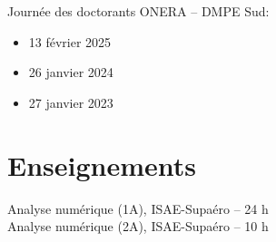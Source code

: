 \noindent
Journée des doctorants ONERA -- DMPE Sud:
\begin{itemize}
    \item[$\bullet$] 13 février 2025
    \item[$\bullet$] 26 janvier 2024
    \item[$\bullet$] 27 janvier 2023
\end{itemize}

\section*{Enseignements}

\noindent
Analyse numérique (1A), ISAE-Supaéro -- 24 h \\ 
Analyse numérique (2A), ISAE-Supaéro -- 10 h
